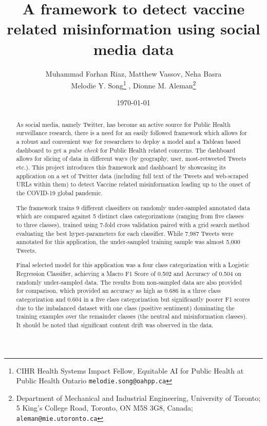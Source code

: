 \documentclass[12pt]{article}
\title{A framework to detect vaccine related misinformation using social media data}
\author{Muhammad Farhan Riaz, Matthew Vassov, Neha Basra \\ Melodie Y. Song\thanks{CIHR Health Systems Impact Fellow, Equitable AI for Public Health at Public Health Ontario {\tt melodie.song@oahpp.ca}} , Dionne M. Aleman\thanks{Department of Mechanical and Industrial Engineering, University of Toronto; 5 King's College Road, Toronto, ON M5S 3G8, Canada; {\tt aleman@mie.utoronto.ca}}}
\date{\today}
\begin{document}
\maketitle



\begin{abstract}
As social media, namely Twitter, has become an active source for Public Health surveillance research, there is a need for an easily followed framework which allows for a robust and convenient way for researchers to deploy a model and a Tableau based dashboard to get a \textit{pulse check} for Public Health related concerns. The dashboard allows for slicing of data in different ways (by geography, user, most-retweeted Tweets etc.). This project introduces this framework and dashboard by showcasing its application on a set of Twitter data (including full text of the Tweets and web-scraped URLs within them) to detect Vaccine related misinformation leading up to the onset of the COVID-19 global pandemic.

The framework trains 9 different classifiers on randomly under-sampled annotated data which are compared against 5 distinct class categorizations (ranging from five classes to three classes), trained using 7-fold cross validation paired with a grid search method evaluating the best hyper-parameters for each classifier. While 7,987 Tweets were annotated for this application, the under-sampled training sample was almost 5,000 Tweets. 

Final selected model for this application was a four class categorization with a Logistic Regression Classifier, achieving a Macro F1 Score of 0.502 and Accuracy of 0.504 on randomly under-sampled data. The results from non-sampled data are also provided for comparison, which provided an accuracy as high as 0.686 in a three class categorization and 0.604 in a five class categorization but significantly poorer F1 scores due to the imbalanced dataset with one class (positive sentiment) dominating the training examples over the remainder classes (the neutral and misinformation classes). It should be noted that significant content drift was observed in the data.


\end{abstract}

\newpage

\tableofcontents




\newpage
\end{document}
